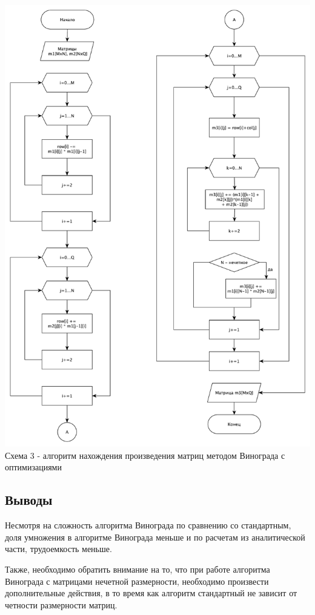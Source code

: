\documentclass[a4paper,14pt]{article} %
\begin{document}
	\begin{center}
        		\includegraphics[scale = 0.53]{shema3} \\ Схема  3 - алгоритм нахождения произведения матриц методом Винограда с оптимизациями
	\end{center}	
	
	\subsection{Выводы}
	\hfill
	
	Несмотря на сложность алгоритма Винограда по сравнению со стандартным, доля умножения в алгоритме Винограда меньше и по расчетам из аналитической части, трудоемкость меньше. 
	
	Также, необходимо обратить внимание на то, что при работе алгоритма Винограда с матрицами нечетной размерности, необходимо произвести дополнительные действия, в то время как алгоритм стандартный не зависит от четности размерности матриц. 
	
\end{document}
